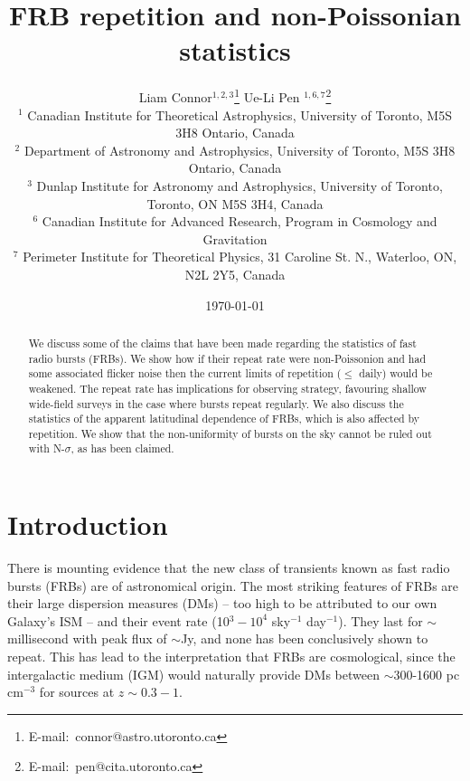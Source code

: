 \documentclass[useAMS,usenatbib]{mn2e}
\title{FRB repetition and non-Poissonian statistics}
\author[Connor et al.]{
Liam Connor$^{1,2,3}$\thanks{E-mail:\ connor@astro.utoronto.ca}
Ue-Li Pen $^{1, 6, 7}$\thanks{E-mail:\ pen@cita.utoronto.ca}
\\
$^1$ Canadian Institute for Theoretical Astrophysics, University of Toronto, M5S 3H8 Ontario, Canada
\\
$^2$ Department of Astronomy and Astrophysics, University of Toronto, 
M5S 3H8 Ontario, Canada
\\
$^3$ Dunlap Institute for Astronomy and Astrophysics, University of Toronto,
Toronto, ON M5S 3H4, Canada
\\
$^6$ Canadian Institute for Advanced Research, Program in Cosmology
and Gravitation
\\
$^7$ Perimeter Institute for Theoretical Physics, 31 Caroline St. N., Waterloo, ON, N2L 2Y5, Canada
}
\begin{document}
\date{\today}
\pagerange{\pageref{firstpage}--\pageref{lastpage}} 
\maketitle
\label{firstpage}

\begin{abstract}
We discuss some of the claims that have been made regarding the statistics of 
fast radio bursts (FRBs). We show how if their repeat rate were non-Poissonion
and had some associated flicker noise then the current limits of repetition ($\le$ daily)
would be weakened. The repeat rate has implications for observing strategy, favouring 
shallow wide-field surveys in the case where bursts repeat regularly. 
We also discuss the statistics of the apparent latitudinal dependence of FRBs, which 
is also affected by repetition. We show that the non-uniformity of bursts on the sky
cannot be ruled out with N-$\sigma$, as has been claimed. 

\end{abstract}
\begin{keywords}
\end{keywords}

\newcommand{\be}{\begin{eqnarray}}
\newcommand{\ee}{\end{eqnarray}}
\newcommand{\beq}{\begin{equation}}
\newcommand{\eeq}{\end{equation}}

\section{Introduction}
There is mounting evidence that the new class of transients 
known as fast radio bursts (FRBs) are of astronomical origin.
The most striking features of FRBs are their large dispersion
measures (DMs) -- too high to be attributed to our own Galaxy's
ISM --
and their event rate (10$^3-10^4$ sky$^{-1}$ day$^{-1}$). They
last for $\sim$millisecond with peak flux of $\sim$Jy, and none
has been conclusively shown to repeat. This has lead to the 
interpretation that FRBs are cosmological,
since the intergalactic medium (IGM) would naturally provide
DMs between $\sim$300-1600 pc cm$^{-3}$ for sources at 
$z\sim0.3-1$. 
\end{document}
